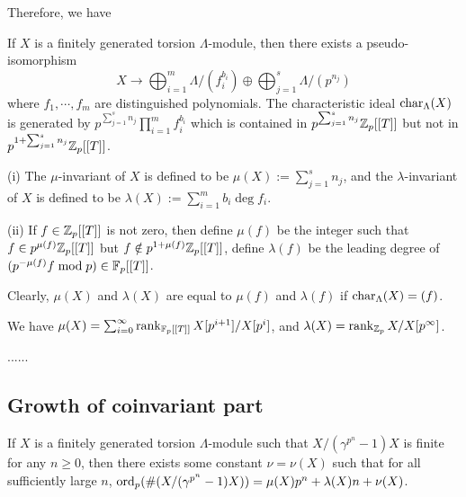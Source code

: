 Therefore, we have

\begin{prop}
\label{Lambda-module-structure}
If $X$ is a finitely generated torsion $\Lambda$-module,
then there exists a pseudo-isomorphism
$$
X\to\bigoplus_{i=1}^m\Lambda/(f_i^{b_i})\oplus\bigoplus_{j=1}^s\Lambda/(p^{n_j})
$$
where $f_1,\cdots,f_m$ are distinguished polynomials.
The characteristic ideal $\operatorname{char}_\Lambda(X)$ is generated by
$p^{\sum_{j=1}^sn_j}\prod_{i=1}^mf_i^{b_i}$
which is contained in $p^{\sum_{j=1}^sn_j}{\mathbb {Z}}_p[[T]]$
but not in $p^{1+\sum_{j=1}^sn_j}{\mathbb {Z}}_p[[T]]$.
\end{prop}

\begin{definition}
\label{iwasawa-mod-invariants}
{\rm(i)}
The $\mu$-invariant of $X$
is defined to be $\mu(X):=\sum_{j=1}^sn_j$,
and the $\lambda$-invariant of $X$
is defined to be $\lambda(X):=\sum_{i=1}^mb_i\deg f_i$.

{\rm(ii)}
If $f\in{\mathbb {Z}}_p[[T]]$ is not zero, then define
$\mu(f)$ be the integer such that
$f\in p^{\mu(f)}{\mathbb {Z}}_p[[T]]$ but
$f\notin p^{1+\mu(f)}{\mathbb {Z}}_p[[T]]$,
define $\lambda(f)$ be the leading degree of
$(p^{-\mu(f)}f\bmod p)\in{\mathbb {F}}_p[[T]]$.
\end{definition}

Clearly, $\mu(X)$ and $\lambda(X)$ are equal to
$\mu(f)$ and $\lambda(f)$ if $\operatorname{char}_\Lambda(X)=(f)$.

\begin{prop}
\label{iwasawa-mod-invariants-2}
We have $\mu(X)=\sum_{i=0}^\infty\operatorname{rank}_{{\mathbb {F}}_p[[T]]}X[p^{i+1}]/X[p^i]$,
and $\lambda(X)=\operatorname{rank}_{{\mathbb {Z}}_p}X/X[p^\infty]$.
\end{prop}

......

\subsection{Growth of coinvariant part}

\begin{prop}
\label{coinvariant-growth}
If $X$ is a finitely generated torsion
$\Lambda$-module such that $X/(\gamma^{p^n}-1)X$ is finite
for any $n\geq 0$, then
there exists some constant $\nu=\nu(X)$
such that for all sufficiently large $n$,
$\operatorname{ord}_p(\#(X/(\gamma^{p^n}-1)X))=\mu(X)p^n
+\lambda(X)n+\nu(X)$.
\end{prop}


